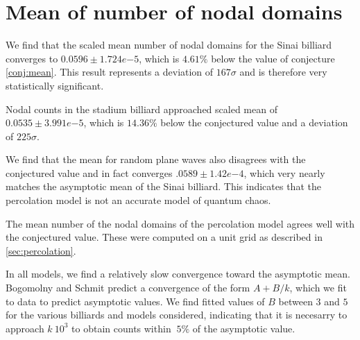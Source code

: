 \documentclass{report}
\begin{document}
\section{Mean of number of nodal domains}
We find that the scaled mean number of nodal domains for the Sinai billiard converges to $0.0596 \pm 1.724e{-5}$, which is $4.61\%$ below the value of conjecture \ref{conj:mean}. This result represents a deviation of $167 \sigma$ and is therefore very statistically significant.

Nodal counts in the stadium billiard approached scaled mean of $0.0535 \pm 3.991e{-5}$, which is $14.36\%$ below the conjectured value and a deviation of $225 \sigma$.

We find that the mean for random plane waves also disagrees with the conjectured value and in fact converges $.0589 \pm 1.42e{-4}$, which very nearly matches the asymptotic mean of the Sinai billiard. This indicates that the percolation model is not an accurate model of quantum chaos.

The mean number of the nodal domains of the percolation model agrees well with the conjectured value. These were computed on a unit grid as described in \ref{sec:percolation}.

In all models, we find a relatively slow convergence toward the asymptotic mean. Bogomolny and Schmit \cite{bogomolny} predict a convergence of the form $A + B/k$, which we fit to data to predict asymptotic values. We find fitted values of $B$ between $3$ and $5$ for the various billiards and models considered, indicating that it is necesarry to approach $k ~ 10^{3}$ to obtain counts within $~5\%$ of the asymptotic value.
\end{document}

